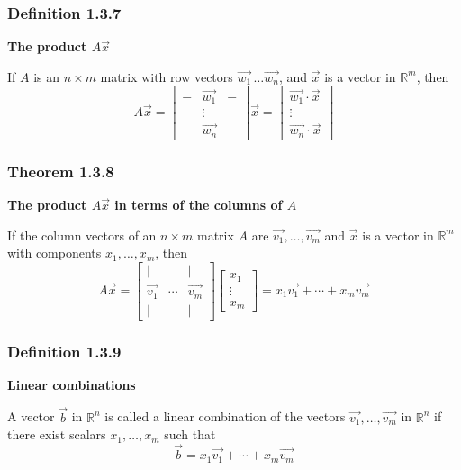 \documentclass{report}
\begin{document}
\subsubsection*{Definition 1.3.7}
\par\noindent\textbf{The product $A\vec{x}$}
\par\noindent If $A$ is an $n\times{}m$ matrix with row vectors $\vec{w_{1}}\,\ldots{}\vec{w_{n}}$, and $\vec{x}$ is a vector in $\mathbb{R}^{m}$, then
\[A\vec{x}=\left[\begin{array}{ccc}- & \vec{w_{1}} & -\\ & \vdots & \\ - & \vec{w_{n}} & - \end{array}\right]\vec{x}=\left[\begin{array}{c}\vec{w_{1}}\cdot\vec{x}\\ \vdots\\ \vec{w_{n}}\cdot\vec{x}\end{array}\right]\]
\subsubsection*{Theorem 1.3.8}
\par\noindent\textbf{The product $A\vec{x}$ in terms of the columns of $A$}
\par\noindent If the column vectors of an $n\times{}m$ matrix $A$ are $\vec{v_{1}},\ldots{},\vec{v_{m}}$ and $\vec{x}$ is a vector in $\mathbb{R}^{m}$ with components $x_{1},\ldots{},x_{m}$, then
\[A\vec{x}=\left[\begin{array}{ccc}| & & | \\ \vec{v_{1}} & \cdots{} & \vec{v_{m}} \\ | & & |\end{array}\right]\left[\begin{array}{c}x_{1} \\ \vdots{} \\ x_{m}\end{array}\right]=x_{1}\vec{v_{1}}+\cdots{}+x_{m}\vec{v_{m}}\]
\subsubsection*{Definition 1.3.9}
\par\noindent\textbf{Linear combinations}
\par\noindent A vector $\vec{b}$ in $\mathbb{R}^{n}$ is called a linear combination of the vectors $\vec{v_{1}},\ldots{},\vec{v_{m}}$ in $\mathbb{R}^{n}$ if there exist scalars $x_{1},\ldots{},x_{m}$ such that
\[\vec{b}=x_{1}\vec{v_{1}}+\cdots{}+x_{m}\vec{v_{m}}\]
\end{document}
